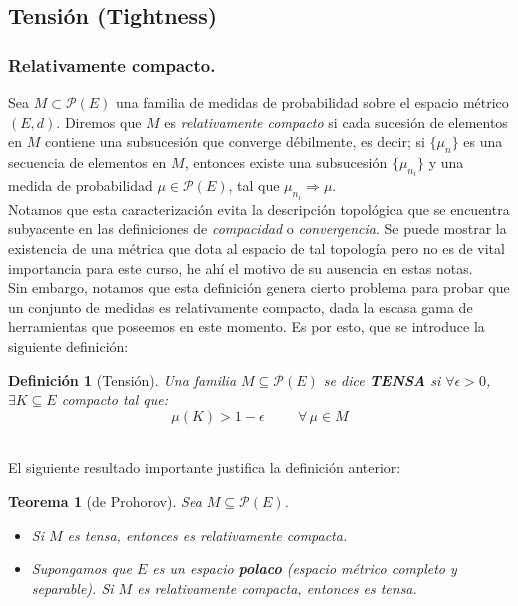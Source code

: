\documentclass[a4paper]{article}
\newtheorem{definicion}{Definición}
\newtheorem{teorema}{Teorema}
\numberwithin{equation}{subsection}
\begin{document}
\subsection{Tensión (Tightness)}
\subsubsection{Relativamente compacto.}
Sea $M\subset \mathcal{P}(E)$ una familia de medidas de probabilidad sobre el espacio métrico $(E,d)$. Diremos que $M$ es \textit{relativamente compacto} si cada sucesión de elementos en $M$ contiene una subsucesión que converge débilmente, es decir; si $\{\mu_n\}$ es una secuencia de elementos en $M$, entonces existe una subsucesión $\{\mu_{n_i}\}$ y una medida de probabilidad $\mu \in \mathcal{P}(E)$, tal que $\mu_{n_i} \Rightarrow \mu$.  \\ \newline
Notamos que esta caracterización evita la descripción topológica que se encuentra subyacente en las definiciones de \textit{compacidad} o \textit{convergencia}. Se puede mostrar la existencia de una métrica que dota al espacio de tal topología pero no es de vital importancia para este curso, he ahí el motivo de su ausencia en estas notas. \\ \newline
Sin embargo, notamos que esta definición genera cierto problema para probar que un conjunto de medidas es relativamente compacto, dada la escasa gama de herramientas que poseemos en este momento. Es por esto, que se introduce la siguiente definición:

\begin{definicion}[Tensión] Una familia $M\subseteq \mathcal{P}(E)$ se dice \textbf{TENSA} si $\forall \epsilon > 0$, $\exists K\subseteq E$ compacto tal que:
\[\mu(K) > 1-\epsilon \hspace{1cm}\forall\,\mu\in M\]
\end{definicion}
\\ \newline
El siguiente resultado importante justifica la definición anterior:


\begin{teorema}[de Prohorov] Sea $M\subseteq \mathcal{P}(E)$.
\begin{itemize}
    \item[i)] Si $M$ es tensa, entonces es relativamente compacta.
    \item[ii)] Supongamos que $E$ es un espacio \textbf{polaco} (espacio métrico completo y separable). Si $M$ es relativamente compacta, entonces es tensa.
\end{itemize}
\end{teorema}
\end{document}
